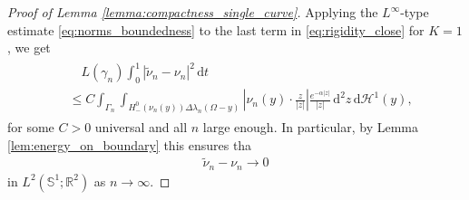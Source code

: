 \documentclass[11pt]{article}
\numberwithin{statement}{section}
\numberwithin{equation}{section}
\theoremstyle{remark}
\newcommand{\R}{\mathbb R} 				%
\newcommand{\intd}{\, \mathrm{d}} 				%
\newcommand{\Sph}{{\mathbb S}}				%
\newcommand{\Hd}{\mathcal H}				%
\begin{document}
\begin{proof}[Proof of Lemma \ref{lemma:compactness_single_curve}]
	Applying the $L^\infty$-type estimate
          \eqref{eq:norms_boundedness} to the last term in
          \eqref{eq:rigidity_close} for $K= 1$, we get
        \begin{align}
	  \begin{split}
            & \quad L(\gamma_{n})  \int_0^1
            |\tilde
            \nu_{n} - \nu_{n}|^2 \intd t \\
            & \leq C \int_{\Gamma_{n}} \int_{
              H^0_-(\nu_{n}(y)) \Delta{\lambda_n}(\Omega - y) }
            \left| \nu_{n}(y) \cdot \frac{ z}{|z|} \right|
            \frac{e^{-\alpha |z|}}{|z|} \intd^2 z \intd \Hd^1(y),
	  \end{split}
	\end{align}
	for some $C > 0$ universal and all $n$ large enough. In
        particular, by Lemma \ref{lem:energy_on_boundary} this ensures
        tha
	\begin{align}\label{eq:rigity_convergence}
		\tilde \nu_{n} - \nu_{n} \to 0
	\end{align}
	in $L^2 (\Sph^1; \R^2)$ as $n \to \infty$.
	

\end{proof}
\end{document}
